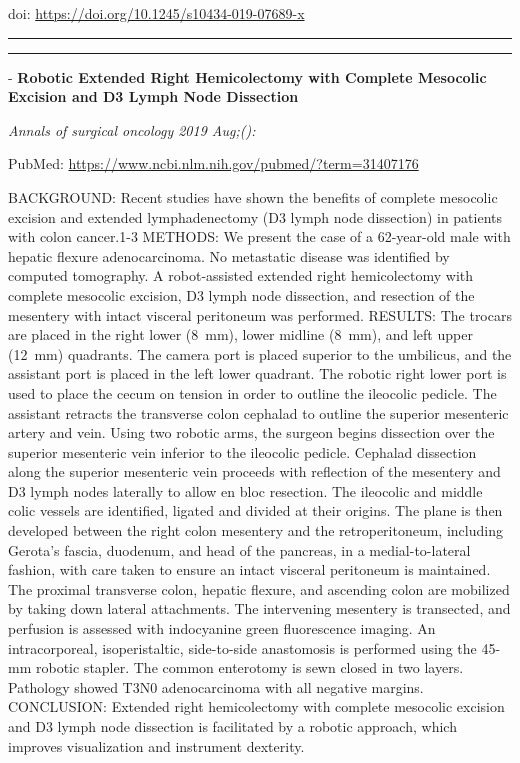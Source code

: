 \documentclass[]{article}
\begin{document}
doi: \url{https://doi.org/10.1245/s10434-019-07689-x}

{}

{}

\begin{center}\rule{0.5\linewidth}{\linethickness}\end{center}

\begin{center}\rule{0.5\linewidth}{\linethickness}\end{center}

 - \textbf{Robotic Extended Right Hemicolectomy with Complete Mesocolic
Excision and D3 Lymph Node Dissection}

\emph{Annals of surgical oncology 2019 Aug;():}

PubMed: \url{https://www.ncbi.nlm.nih.gov/pubmed/?term=31407176}

BACKGROUND: Recent studies have shown the benefits of complete mesocolic
excision and extended lymphadenectomy (D3 lymph node dissection) in
patients with colon cancer.1-3 METHODS: We present the case of a
62-year-old male with hepatic flexure adenocarcinoma. No metastatic
disease was identified by computed tomography. A robot-assisted extended
right hemicolectomy with complete mesocolic excision, D3 lymph node
dissection, and resection of the mesentery with intact visceral
peritoneum was performed. RESULTS: The trocars are placed in the right
lower (8~mm), lower midline (8~mm), and left upper (12~mm) quadrants.
The camera port is placed superior to the umbilicus, and the assistant
port is placed in the left lower quadrant. The robotic right lower port
is used to place the cecum on tension in order to outline the ileocolic
pedicle. The assistant retracts the transverse colon cephalad to outline
the superior mesenteric artery and vein. Using two robotic arms, the
surgeon begins dissection over the superior mesenteric vein inferior to
the ileocolic pedicle. Cephalad dissection along the superior mesenteric
vein proceeds with reflection of the mesentery and D3 lymph nodes
laterally to allow en bloc resection. The ileocolic and middle colic
vessels are identified, ligated and divided at their origins. The plane
is then developed between the right colon mesentery and the
retroperitoneum, including Gerota's fascia, duodenum, and head of the
pancreas, in a medial-to-lateral fashion, with care taken to ensure an
intact visceral peritoneum is maintained. The proximal transverse colon,
hepatic flexure, and ascending colon are mobilized by taking down
lateral attachments. The intervening mesentery is transected, and
perfusion is assessed with indocyanine green fluorescence imaging. An
intracorporeal, isoperistaltic, side-to-side anastomosis is performed
using the 45-mm robotic stapler. The common enterotomy is sewn closed in
two layers. Pathology showed T3N0 adenocarcinoma with all negative
margins. CONCLUSION: Extended right hemicolectomy with complete
mesocolic excision and D3 lymph node dissection is facilitated by a
robotic approach, which improves visualization and instrument dexterity.
\end{document}
